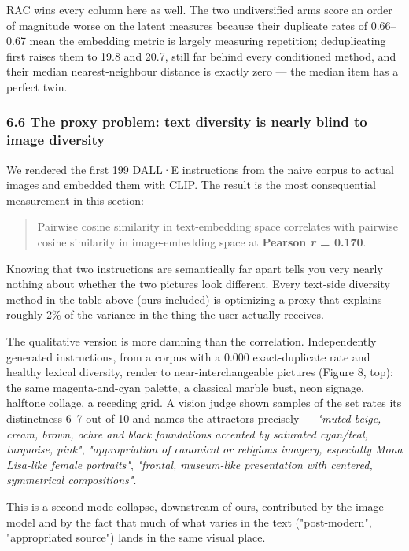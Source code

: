 \documentclass[
  11pt,
]{article}
\theoremstyle{plain}
\theoremstyle{definition}
\begin{document}
RAC wins every column here as well. The two undiversified arms score an
order of magnitude worse on the latent measures because their duplicate
rates of 0.66--0.67 mean the embedding metric is largely measuring
repetition; deduplicating first raises them to 19.8 and 20.7, still far
behind every conditioned method, and their median nearest-neighbour
distance is exactly zero --- the median item has a perfect twin.

\subsubsection{6.6 The proxy problem: text diversity is nearly blind to
image
diversity}\label{66-the-proxy-problem-text-diversity-is-nearly-blind-to-image-diversity}

We rendered the first 199 DALL·E instructions from the naive corpus to
actual images and embedded them with CLIP. The result is the most
consequential measurement in this section:

\begin{quote}
Pairwise cosine similarity in text-embedding space correlates with
pairwise cosine similarity in image-embedding space at \textbf{Pearson
\emph{r} = 0.170}.
\end{quote}

Knowing that two instructions are semantically far apart tells you very
nearly nothing about whether the two pictures look different. Every
text-side diversity method in the table above (ours included) is
optimizing a proxy that explains roughly 2\% of the variance in the
thing the user actually receives.

The qualitative version is more damning than the correlation.
Independently generated instructions, from a corpus with a 0.000
exact-duplicate rate and healthy lexical diversity, render to
near-interchangeable pictures (Figure 8, top): the same magenta-and-cyan
palette, a classical marble bust, neon signage, halftone collage, a
receding grid. A vision judge shown samples of the set rates its
distinctness 6--7 out of 10 and names the attractors precisely ---
\emph{"muted beige, cream, brown, ochre and black foundations accented
by saturated cyan/teal, turquoise, pink"}, \emph{"appropriation of
canonical or religious imagery, especially Mona Lisa-like female
portraits"}, \emph{"frontal, museum-like presentation with centered,
symmetrical compositions"}.

This is a second mode collapse, downstream of ours, contributed by the
image model and by the fact that much of what varies in the text
("post-modern", "appropriated source") lands in the same visual place.
\end{document}
